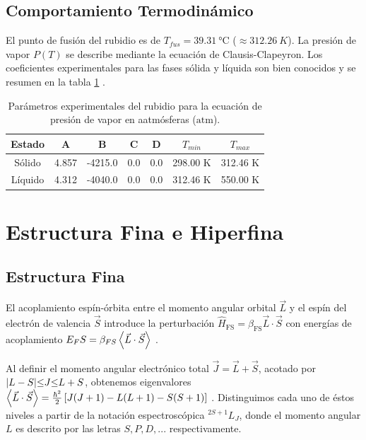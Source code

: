 \subsection*{Comportamiento Termodinámico}
El punto de fusión del rubidio es de $T_{fus} = \SI{39.31}{\degreeCelsius}$ ($\approx \SI{312.26}{K}$). La presión de vapor $P(T)$ se describe mediante la ecuación de Clausis-Clapeyron. Los coeficientes experimentales para las fases sólida y líquida son bien conocidos y se resumen en la tabla \ref{tab:rb_pressure_params} \cite{alcockVapourPressureEquations1984,  nesmeyanovVapourPressureElements}.
\begin{table}[htbp]
  \centering
  \caption{Parámetros experimentales del rubidio para la ecuación de presión de vapor en aatmósferas ($\text{atm}$).}
    \begin{tabular}{cccccrr}
    \toprule
    \textbf{Estado} &
      \textbf{A } &
      \textbf{B} &
      \textbf{C} &
      \textbf{D} &
      \multicolumn{1}{c}{\boldmath{}\textbf{$T_{min}$}\unboldmath{}} &
      \multicolumn{1}{c}{\boldmath{}\textbf{$T_{max}$}\unboldmath{}}
      \\
    \midrule
    Sólido &
      4.857 &
      -4215.0 &
      0.0 &
      0.0 &
      298.00 K&
      312.46 K
      \\
    \midrule
    Líquido &
      4.312 &
      -4040.0 &
      0.0 &
      0.0 &
      312.46 K&
      550.00 K
      \\
    \bottomrule
    \end{tabular}%
  \label{tab:rb_pressure_params}%
\end{table}%
\section{Estructura Fina e Hiperfina}
\subsection*{Estructura Fina}
El acoplamiento espín-órbita entre el momento angular orbital $\vec{L}$ y el espín del electrón de valencia $\vec{S}$ introduce la perturbación $\hat{H}_{\text{FS}} = \beta_{\text{FS}} \vec{L} \cdot \vec{S}$ con energías de acoplamiento $E_FS = \beta_{FS} \expval{\vec{L} \cdot \vec{S}}$ \cite{footAtomicPhysics2005}. 

Al definir el momento angular electrónico total $\vec{J} = \vec{L} + \vec{S}$, acotado por $\lvert L-S \rvert {\leq} J {\leq} L + S$, obtenemos eigenvalores $\expval{\vec{L} \cdot \vec{S}} = \frac{\hbar^2}{2} \left[J(J+1) - L(L+1) - S(S+1)\right]$ \cite{griffithsIntroductionQuantumMechanics2017}. Distinguimos cada uno de éstos niveles a partir de la notación espectroscópica $^{2S +1}L_J$, donde el momento angular $L$ es descrito por las letras $S, P, D, ...$ respectivamente.


